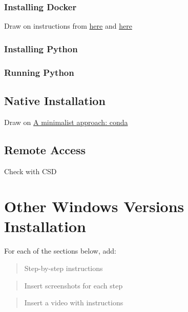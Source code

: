 \documentclass[
]{book}
\begin{document}
\hypertarget{installing-docker}{%
\subsection{Installing Docker}\label{installing-docker}}

Draw on instructions from \href{https://gdsl-ul.github.io/the_knowledge/docker.html}{here} and \href{https://darribas.org/gds_env/guides/docker_install/}{here}

\hypertarget{installing-python}{%
\subsection{Installing Python}\label{installing-python}}

\hypertarget{running-python}{%
\subsection{Running Python}\label{running-python}}

\hypertarget{native-installation}{%
\section{Native Installation}\label{native-installation}}

Draw on \href{http://darribas.org/gds19/software.html}{A minimalist approach: conda}

\hypertarget{remote-access}{%
\section{Remote Access}\label{remote-access}}

Check with CSD

\hypertarget{otherwin}{%
\chapter{Other Windows Versions Installation}\label{otherwin}}

For each of the sections below, add:

\begin{quote}
Step-by-step instructions
\end{quote}

\begin{quote}
Insert screenshots for each step
\end{quote}

\begin{quote}
Insert a video with instructions
\end{quote}
\end{document}
